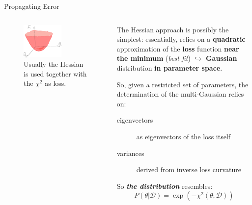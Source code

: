 \documentclass[9pt]{beamer}
\begin{document}
\begin{frame}{Propagating Error}
    \begin{columns}
        \begin{column}{0.5\textwidth}
            \begin{figure}
                \centering
                \includegraphics[width=0.6\textwidth]{hessian}
                \caption*{
                    Usually the Hessian is used together with the $\chi^2$ as
                    loss.
                }
            \end{figure}
        \end{column}
        \begin{column}{0.5\textwidth}
            The Hessian approach is possibly the simplest: essentially, relies
            on a \textbf{quadratic} approximation of the \textbf{loss} function
            \textbf{near the minimum} (\textit{best fit}) $\hookrightarrow$
            \alert{\textbf{Gaussian}} distribution \alert{\textbf{in parameter
            space}}.
            \vspace*{10pt}

            So, given a restricted set of parameters, the determination of the
            multi-Gaussian relies on:
            \begin{description}
                \item[eigenvectors] as eigenvectors of the loss itself
                \item[variances] derived from inverse loss curvature
            \end{description}
            \vspace*{20pt}

            So \textit{\textbf{the distribution}} resembles:
            \begin{equation*}
                P(\theta | \mathcal{D}) = \exp(-\chi^2(\theta; \mathcal{D}))
            \end{equation*}
        \end{column}
    \end{columns}
\end{frame}
\end{document}
